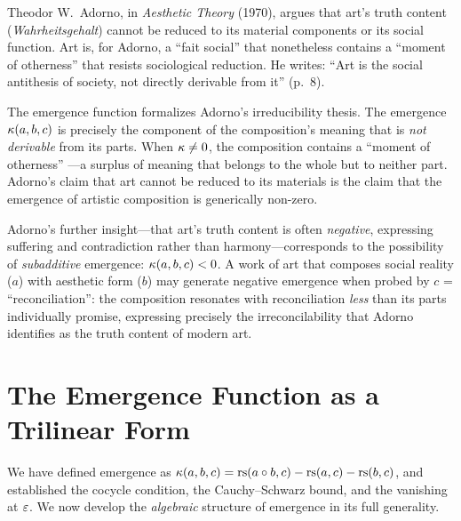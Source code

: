\begin{interpretation}\label{interp:ch5:adorno_aesthetics}
Theodor W.~Adorno, in \emph{Aesthetic Theory} (1970), argues that art's
truth content (\emph{Wahrheitsgehalt}) cannot be reduced to its material
components or its social function. Art is, for Adorno, a ``fait social''
that nonetheless contains a ``moment of otherness'' that resists
sociological reduction. He writes: ``Art is the social antithesis of
society, not directly derivable from it'' (p.~8).

The emergence function formalizes Adorno's irreducibility thesis. The
emergence $\kappa(a, b, c)$ is precisely the component of the
composition's meaning that is \emph{not derivable} from its parts.
When $\kappa \neq 0$, the composition contains a ``moment of otherness''
---a surplus of meaning that belongs to the whole but to neither part.
Adorno's claim that art cannot be reduced to its materials is the claim
that the emergence of artistic composition is generically non-zero.

Adorno's further insight---that art's truth content is often
\emph{negative}, expressing suffering and contradiction rather than
harmony---corresponds to the possibility of \emph{subadditive} emergence:
$\kappa(a, b, c) < 0$. A work of art that composes social reality ($a$)
with aesthetic form ($b$) may generate negative emergence when probed
by $c$ = ``reconciliation'': the composition resonates with reconciliation
\emph{less} than its parts individually promise, expressing precisely
the irreconcilability that Adorno identifies as the truth content of
modern art.
\end{interpretation}

\section{The Emergence Function as a Trilinear Form}

We have defined emergence as $\kappa(a,b,c) = \mathrm{rs}(a \circ b, c) -
\mathrm{rs}(a,c) - \mathrm{rs}(b,c)$, and established the cocycle condition, the
Cauchy--Schwarz bound, and the vanishing at $\varepsilon$. We now develop the
\emph{algebraic} structure of emergence in its full generality.


